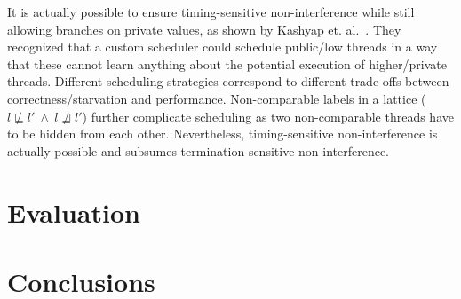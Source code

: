 \documentclass[10pt,preprint]{sigplanconf}
\begin{document}
It is actually possible to ensure timing-sensitive non-interference while still allowing branches on private values, as shown by Kashyap et. al.~\cite{kashyap2011}.  They recognized that a custom scheduler could schedule public/low threads in a way that these cannot learn anything about the potential execution of higher/private threads.  Different scheduling strategies correspond to different trade-offs between correctness/starvation and performance.  Non-comparable labels in a lattice ($l \not \sqsubseteq l'~\wedge~l \not \sqsupseteq l'$) further complicate scheduling as two non-comparable threads have to be hidden from each other.  Nevertheless, timing-sensitive non-interference is actually possible and subsumes termination-sensitive non-interference.

\section{Evaluation}



\section{Conclusions}




\end{document}
